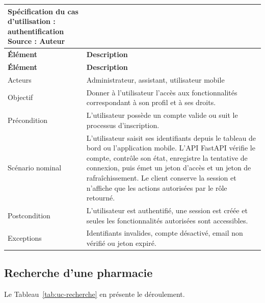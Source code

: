 \begin{longtable}{L{4cm}L{10cm}}
    \caption{Spécification du cas d'utilisation : authentification\\ \small Source : Auteur}\label{tab:uc-authentification}\\
    \toprule
    \textbf{Élément} & \textbf{Description} \\
    \midrule
    \endfirsthead
    \toprule
    \textbf{Élément} & \textbf{Description} \\
    \midrule
    \endhead
    Acteurs & Administrateur, assistant, utilisateur mobile \\
    Objectif & Donner à l'utilisateur l'accès aux fonctionnalités correspondant à son profil et à ses droits. \\
    Précondition & L'utilisateur possède un compte valide ou suit le processus d'inscription. \\
    Scénario nominal & L'utilisateur saisit ses identifiants depuis le tableau de bord ou l'application mobile. L'API FastAPI vérifie le compte, contrôle son état, enregistre la tentative de connexion, puis émet un jeton d'accès et un jeton de rafraîchissement. Le client conserve la session et n'affiche que les actions autorisées par le rôle retourné. \\
    Postcondition & L'utilisateur est authentifié, une session est créée et seules les fonctionnalités autorisées sont accessibles. \\
    Exceptions & Identifiants invalides, compte désactivé, email non vérifié ou jeton expiré. \\
    \bottomrule
\end{longtable}

\subsection{Recherche d'une pharmacie}

Le Tableau~\ref{tab:uc-recherche} en présente le déroulement.

